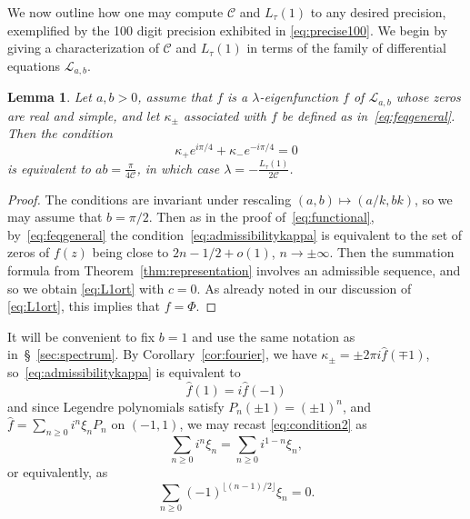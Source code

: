 \documentclass[12pt]{amsart}
\theoremstyle{plain}
\newtheorem{lemma}[theorem]{Lemma}
\numberwithin{equation}{section}
\theoremstyle{definition}
\newcommand{\Cone}{\mathscr{C}}
\begin{document}
We now outline how one may compute $\Cone$ and $L_{\tau}(1)$ to any desired precision, exemplified by the 100 digit precision exhibited in \eqref{eq:precise100}.
We begin by giving a characterization of $\Cone$ and $L_{\tau}(1)$ in terms of the family of differential equations $\mathcal{L}_{a,b}$.
\begin{lemma}\label{lem:computeC}
	Let $a,b>0$, assume that $f$ is a $\lambda$-eigenfunction $f$ of $\mathcal{L}_{a,b}$ whose zeros are real and simple, and let $\kappa_{\pm}$ associated with $f$ be defined as in~\eqref{eq:feqgeneral}. Then the condition
	\begin{equation} \label{eq:admissibilitykappa}
		\kappa_{+}e^{i\pi/4}+\kappa_{-}e^{-i\pi/4} = 0
	\end{equation}
	is equivalent to $ab=\frac{\pi}{4\Cone}$, in which case $\lambda=-\frac{L_{\tau}(1)}{2\Cone}$.
\end{lemma}
\begin{proof}
	The conditions are invariant under rescaling $(a,b)\mapsto (a/k,bk)$, so we may assume that $b=\pi/2$. Then as in the proof of~\eqref{eq:functional}, by~\eqref{eq:feqgeneral} the condition~\eqref{eq:admissibilitykappa} is equivalent to the set of zeros of $f(z)$ being close to $2n-1/2+o(1)$, $n\to \pm \infty$. Then the summation formula from Theorem~\ref{thm:representation} involves an admissible sequence, and so we obtain \eqref{eq:L1ort} with $c=0$. As already noted in our discussion of \eqref{eq:L1ort}, this implies that  $f=\Phi$.
\end{proof}
It will be convenient to fix $b=1$ and use the same notation as in~\S~\ref{sec:spectrum}.
By Corollary~\ref{cor:fourier}, we have $\kappa_{\pm}=\pm 2\pi i\widehat{f}(\mp 1)$, so~\eqref{eq:admissibilitykappa} is equivalent to
	\begin{equation} \label{eq:condition2} \widehat{f}(1) = i\widehat{f}(-1)\end{equation}
and since Legendre polynomials satisfy $P_n(\pm1) = (\pm1)^n$, and $\widehat{f} = \sum_{n\ge0}i^n\xi_n P_n$ on $(-1,1)$, we may recast \eqref{eq:condition2}  as
	\begin{equation*} \label{eq:Cequation0}
	\sum_{n\ge0}i^n\xi_n = \sum_{n\ge0}i^{1-n}\xi_n,
	\end{equation*}
or equivalently, as
	\begin{equation} \label{eq:Cequation}
	\sum_{n\ge0}(-1)^{\lfloor (n-1)/2\rfloor}\xi_n = 0.
	\end{equation}
\end{document}
